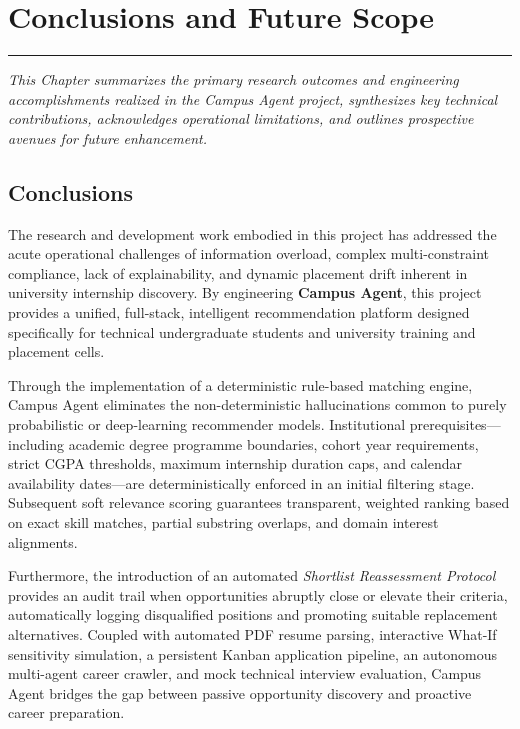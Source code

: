 \chapter{Conclusions and Future Scope}
\label{C7} %
\graphicspath{{images/}{Figures/}}
\noindent\rule{\linewidth}{2pt}
\textit{This Chapter summarizes the primary research outcomes and engineering accomplishments realized in the Campus Agent project, synthesizes key technical contributions, acknowledges operational limitations, and outlines prospective avenues for future enhancement.}
\section{Conclusions} \label{S7.1}
The research and development work embodied in this project has addressed the acute operational challenges of information overload, complex multi-constraint compliance, lack of explainability, and dynamic placement drift inherent in university internship discovery. By engineering \textbf{Campus Agent}, this project provides a unified, full-stack, intelligent recommendation platform designed specifically for technical undergraduate students and university training and placement cells.

Through the implementation of a deterministic rule-based matching engine, Campus Agent eliminates the non-deterministic hallucinations common to purely probabilistic or deep-learning recommender models. Institutional prerequisites---including academic degree programme boundaries, cohort year requirements, strict CGPA thresholds, maximum internship duration caps, and calendar availability dates---are deterministically enforced in an initial filtering stage. Subsequent soft relevance scoring guarantees transparent, weighted ranking based on exact skill matches, partial substring overlaps, and domain interest alignments. 

Furthermore, the introduction of an automated \textit{Shortlist Reassessment Protocol} provides an audit trail when opportunities abruptly close or elevate their criteria, automatically logging disqualified positions and promoting suitable replacement alternatives. Coupled with automated PDF resume parsing, interactive What-If sensitivity simulation, a persistent Kanban application pipeline, an autonomous multi-agent career crawler, and mock technical interview evaluation, Campus Agent bridges the gap between passive opportunity discovery and proactive career preparation.

